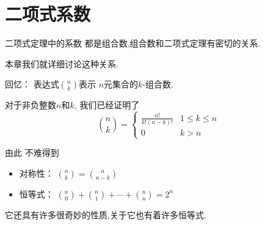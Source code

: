 \documentclass[10pt,punct]{ctexbeamer}
\begin{document}
%
%
%
%




\begin{frame}
    \tableofcontents
\end{frame}
\section{二项式系数}



\begin{frame}

    二项式定理中的系数 都是组合数,组合数和二项式定理有密切的关系.

    本章我们就详细讨论这种关系.


    回忆：  表达式$\binom{n}{k}$表示 $n$元集合的$k$-组合数.





    对于非负整数$n$和$k$, 我们已经证明了\vspace{8pt}
    $$
    \binom{n}{k}=\left\{\begin{array}{cc}
        \frac{n!}{k!(n-k)!} &1 \le {k} \le {n}
        \\[6pt]
        {0} & {k}>n
    \end{array}\right.$$

    由此 不难得到


    \begin{itemize}

        \item 对称性：  $\binom{n}{k}=\binom{n}{n-k}$

        \item 恒等式： $\binom{n}{0}+\binom{n}{1}+\cdots+\binom{n}{n}=2^{n}$


    \end{itemize}


    它还具有许多很奇妙的性质,关于它也有着许多恒等式.


\end{frame}
\end{document}
